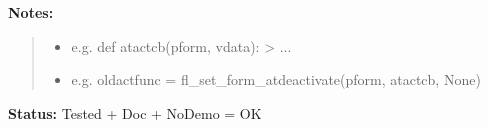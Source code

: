 \begin{boxedminipage}{\funcwidth}
\begin{quote}
      \end{quote}

\textbf{Notes:}
\begin{quote}
  \begin{itemize}

  \item
    \setlength{\parskip}{0.6ex}

e.g. def atactcb(pform, vdata): > ...


  \item 
e.g. oldactfunc = fl\_set\_form\_atdeactivate(pform, atactcb, None)


\end{itemize}

\end{quote}

\textbf{Status:} 
Tested + Doc + NoDemo = OK


    \end{boxedminipage}

    \label{xformslib:flbasic:fl_set_form_atdeactivate}

    \vspace{0.5ex}

